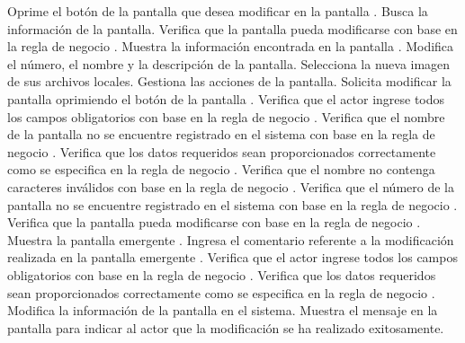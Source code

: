  \begin{UCtrayectoria}
	\UCpaso[\UCactor] Oprime el botón \btnEditar de la pantalla que desea modificar en la pantalla .
	\UCpaso[\UCsist] Busca la información de la pantalla.
	\UCpaso[\UCsist] Verifica que la pantalla pueda modificarse con base en la regla de negocio . 
    \UCpaso[\UCsist] Muestra la información encontrada en la pantalla .
    \UCpaso[\UCactor] Modifica el número, el nombre y la descripción de la pantalla. \label{cu6.2:ingresaDatos}
    \UCpaso[\UCactor] Selecciona la nueva imagen de sus archivos locales.\label{cu6.2:seleccionaImagen}
    \UCpaso[\UCactor] Gestiona las acciones de la pantalla.\label{cu6.2:gestionaAcciones}
    \UCpaso[\UCactor] Solicita modificar la pantalla oprimiendo el botón  de la pantalla .  
    \UCpaso[\UCsist] Verifica que el actor ingrese todos los campos obligatorios con base en la regla de negocio  . 
    \UCpaso[\UCsist] Verifica que el nombre de la pantalla no se encuentre registrado en el sistema con base en la regla de negocio  . 
    \UCpaso[\UCsist] Verifica que los datos requeridos sean proporcionados correctamente como se especifica en la regla de negocio .    
    \UCpaso[\UCsist] Verifica que el nombre no contenga caracteres inválidos con base en la regla de negocio . 
    \UCpaso[\UCsist] Verifica que el número de la pantalla no se encuentre registrado en el sistema con base en la regla de negocio  .     
	\UCpaso[\UCsist] Verifica que la pantalla pueda modificarse con base en la regla de negocio . 
	\UCpaso[\UCsist] Muestra la pantalla emergente .
	\UCpaso[\UCactor] Ingresa el comentario referente a la modificación realizada en la pantalla emergente . \label{cu6.2:ingresaComentario}
    \UCpaso[\UCsist] Verifica que el actor ingrese todos los campos obligatorios con base en la regla de negocio  . 
    \UCpaso[\UCsist] Verifica que los datos requeridos sean proporcionados correctamente como se especifica en la regla de negocio . 
    \UCpaso[\UCsist] Modifica la información de la pantalla en el sistema.
    \UCpaso[\UCsist] Muestra el mensaje  en la pantalla 
    para indicar al actor que la modificación se ha realizado exitosamente.
 \end{UCtrayectoria}
 
